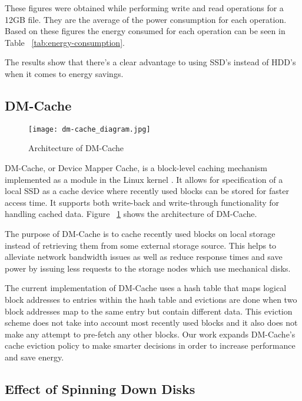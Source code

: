 These figures were obtained while performing write and read operations for a
12GB file. They are the average of the power consumption for each
operation. Based on these figures the energy consumed for each operation can be
seen in Table ~\ref{tab:energy-consumption}.

The results show that there's a clear advantage to using SSD's instead of HDD's
when it comes to energy savings.

\subsection{DM-Cache}

\begin{figure}[t]
  \caption{Architecture of DM-Cache}
  \centering \texttt{[image: dm-cache\_diagram.jpg]}
  \label{fig:dm-cache}
\end{figure}

DM-Cache, or Device Mapper Cache, is a block-level caching mechanism implemented
as a module in the Linux kernel \cite{DM-Cache}. It allows for specification of
a local SSD as a cache device where recently used blocks can be stored for
faster access time. It supports both write-back and write-through functionality
for handling cached data. Figure ~\ref{fig:dm-cache} shows the architecture of
DM-Cache.

The purpose of DM-Cache is to cache recently used blocks on local storage
instead of retrieving them from some external storage source. This helps to
alleviate network bandwidth issues as well as reduce response times and save
power by issuing less requests to the storage nodes which use mechanical disks.

The current implementation of DM-Cache uses a hash table that maps logical block
addresses to entries within the hash table and evictions are done when two block
addresses map to the same entry but contain different data. This eviction scheme
does not take into account most recently used blocks and it also does not make
any attempt to pre-fetch any other blocks. Our work expands DM-Cache's cache
eviction policy to make smarter decisions in order to increase performance and
save energy.

\subsection{Effect of Spinning Down Disks}


